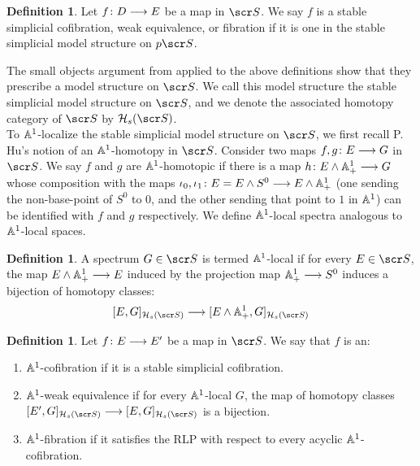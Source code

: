 \documentclass{amsart}
\theoremstyle{definition}
\newtheorem{defn}[thm]{Definition}
\begin{document}
\begin{defn}
Let $f \colon D \longrightarrow E$ be a map in $\sS$. We say $f$ is a stable simplicial cofibration, weak equivalence, or fibration if it is one in the stable simplicial model structure on $p\sS$.
\end{defn}

\noindent The small objects argument from \cite[Chapter 15]{Hu03} applied to the above definitions show that they prescribe a model structure on $\sS$. We call this model structure the stable simplicial model structure on $\sS$, and we denote the associated homotopy category of $\sS$ by $\oH_s(\sS)$.\\

To $\mathbb{A}^1$-localize the stable simplicial model structure on $\sS$, we first recall P. Hu's notion of an $\mathbb{A}^1$-homotopy in $\sS$. Consider two maps $f, g \colon E \longrightarrow G$ in $\sS$. We say $f$ and $g$ are $\mathbb{A}^1$-homotopic if there is a map $h \colon E \wedge \mathbb{A}^1_+ \longrightarrow G$ whose composition with the maps $\iota_0, \iota_1 \colon E = E \wedge S^0 \longrightarrow E \wedge \mathbb{A}^1_+$ (one sending the non-base-point of $S^0$ to $0$, and the other sending that point to $1$ in $\mathbb{A}^1$) can be identified with $f$ and $g$ respectively. We define $\mathbb{A}^1$-local spectra analogous to $\mathbb{A}^1$-local spaces.

\begin{defn}
A spectrum $G \in \sS$ is termed $\mathbb{A}^1$-local if for every $E \in \sS$, the map $E \wedge \mathbb{A}^1_+ \longrightarrow E$ induced by the projection map $\mathbb{A}^1_+ \longrightarrow S^0$ induces a bijection of homotopy classes:
\[[E,G]_{\oH_s(\sS)} \rtarr [E \wedge \bA^1_+, G]_{\oH_s(\sS)}\]
\end{defn}

\begin{defn}
Let $f \colon E \longrightarrow E'$ be a map in $\sS$. We say that $f$ is an:
\begin{enumerate}
\item $\mathbb{A}^1$-cofibration if it is a stable simplicial cofibration.
\item $\mathbb{A}^1$-weak equivalence if for every $\mathbb{A}^1$-local $G$, the map of homotopy classes $[E',G]_{\oH_s(\sS)} \rtarr [E,G]_{\oH_s(\sS)}$ is a bijection.
\item $\mathbb{A}^1$-fibration if it satisfies the RLP with respect to every acyclic $\mathbb{A}^1$-cofibration.
\end{enumerate}
\end{defn}
\end{document}
